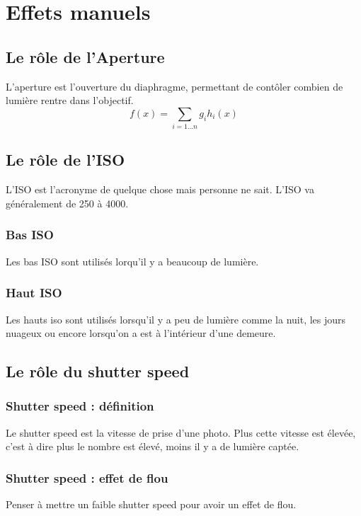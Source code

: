 \documentclass{article}
\begin{document}
\maketitle

\section{Effets manuels}
\subsection{Le rôle de l'Aperture}
L'aperture est l'ouverture du diaphragme, permettant de contôler combien de lumière rentre dans l'objectif.
$$f(x) = \sum_{i=1...n}g_{i}h_{i}(x)$$
\subsection{Le rôle de l'ISO}
L'ISO est l'acronyme de quelque chose mais personne ne sait. L'ISO va généralement de 250 à 4000.

\subsubsection{Bas ISO}
Les bas ISO sont utilisés lorqu'il y a beaucoup de lumière.

\subsubsection{Haut ISO}
Les hauts iso sont utilisés lorsqu'il y a peu de lumière comme la nuit, les jours nuageux ou encore lorsqu'on a est à l'intérieur d'une demeure.

\subsection{Le rôle du shutter speed}

\subsubsection{Shutter speed : définition}

Le shutter speed est la vitesse de prise d'une photo. Plus cette vitesse est élevée, c'est à dire plus le nombre est élevé, moins il y a de lumière captée.

\subsubsection{Shutter speed : effet de flou}
Penser à mettre un faible shutter speed pour avoir un effet de flou.
\end{document}
